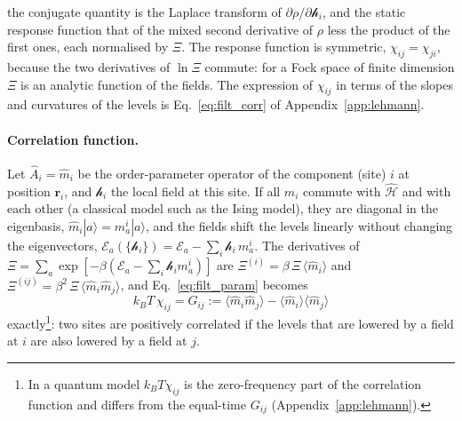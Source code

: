 \documentclass[10pt,a4paper]{article}
\theoremstyle{plain}
\newcommand{\hfield}{\mathscr{h}}  %
\newcommand{\enrg}{\mathcal{E}}  %
\begin{document}
the conjugate quantity is the Laplace transform of
$\partial \rho/\partial \hfield_i$, and the static response function that of
the mixed second derivative of $\rho$ less the product of the first ones,
each normalised by $ \Xi $. The response function is symmetric,
$\chi_{ij}=\chi_{ji}$, because the two derivatives of $\ln\Xi$ commute: for
a Fock space of finite dimension $\Xi$ is an analytic function of the fields.
The expression of $\chi_{ij}$ in terms of the slopes and curvatures of the
levels is Eq.~\eqref{eq:filt_corr} of Appendix~\ref{app:lehmann}.

\paragraph{Correlation function.} Let $\hat A_i=\hat m_i$ be the
order-parameter operator of the component (site) $i$ at position
$\mathbf r_i$, and $\hfield_i$ the local field at this site. If all
$\hat m_i$ commute with $\hat{\mathcal H}$ and with each other (a classical
model such as the Ising model), they are diagonal in the eigenbasis,
$\hat m_i|a\rangle=m^{i}_a|a\rangle$, and the fields shift the levels
linearly without changing the eigenvectors,
$\enrg_a(\{\hfield_i\})=\enrg_a-\sum_i\hfield_i\,m^{i}_a$. The derivatives of
$\Xi=\sum_a\exp[-\beta(\enrg_a-\sum_i\hfield_im^{i}_a)]$ are
$\Xi^{(i)}=\beta\,\Xi\,\langle\hat m_i\rangle$ and
$\Xi^{(ij)}=\beta^{2}\,\Xi\,\langle\hat m_i\hat m_j\rangle$, and
Eq.~\eqref{eq:filt_param} becomes
\begin{equation}\label{eq:filt_G}
  k_BT\,\chi_{ij}=G_{ij}:=\langle\hat m_i\hat m_j\rangle
  -\langle\hat m_i\rangle\langle\hat m_j\rangle
\end{equation}
exactly\footnote{In a quantum model $k_BT\chi_{ij}$ is the zero-frequency
part of the correlation function and differs from the equal-time $G_{ij}$
(Appendix~\ref{app:lehmann}).}: two sites are positively correlated if the
levels that are lowered by a field at $i$ are also lowered by a field at
$j$.
\end{document}
